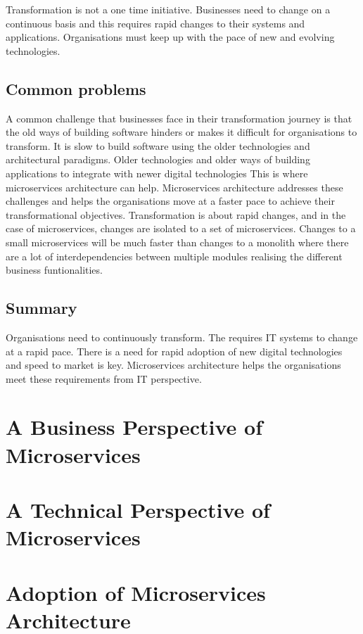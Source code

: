 \documentclass[a4paper, 11pt]{book}
\begin{document}
    Transformation is not a one time initiative.
    Businesses need to change on a continuous basis and this requires rapid changes to their systems and applications.
    Organisations must keep up with the pace of new and evolving technologies.

    \subsection{Common problems}
    A common challenge that businesses face in their transformation journey is that the old ways of building software hinders or makes it difficult for organisations to transform.
    It is slow to build software using the older technologies and architectural paradigms.
    Older technologies and older ways of building applications to integrate with newer digital technologies
    This is where microservices architecture can help.
    Microservices architecture addresses these challenges and helps the organisations move at a faster pace to achieve their transformational objectives.
    Transformation is about rapid changes, and in the case of microservices, changes are isolated to a set of microservices.
    Changes to a small microservices will be much faster than changes to a monolith where there are a lot of interdependencies between multiple modules realising the different business funtionalities.

    \subsection{Summary}
    Organisations need to continuously transform.
    The requires IT systems to change at a rapid pace.
    There is a need for rapid adoption of new digital technologies and speed to market is key.
    Microservices architecture helps the organisations meet these requirements from IT perspective.


    \section{A Business Perspective of Microservices}


    \section{A Technical Perspective of Microservices}


    \section{Adoption of Microservices Architecture}
\end{document}
